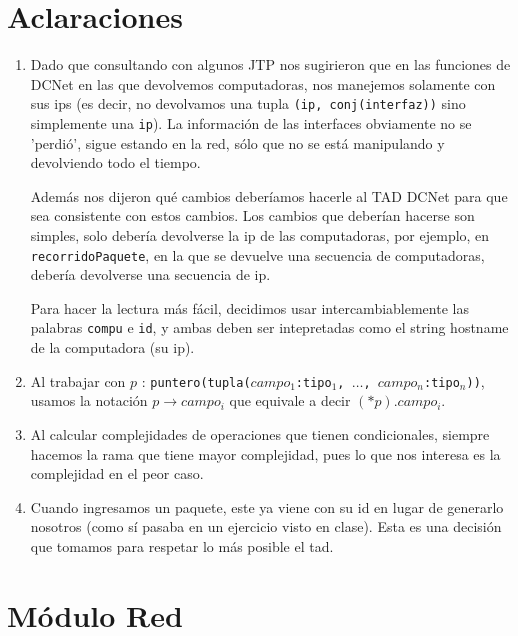 \documentclass[a4paper,10pt, nofootinbib]{article}
\begin{document}
\maketitle
\thispagestyle{empty}

\section{Aclaraciones}
\begin{enumerate}
  \item Dado que consultando con algunos JTP nos sugirieron que en las funciones de DCNet en las que devolvemos computadoras, nos manejemos solamente con sus ips (es decir, no devolvamos una tupla \texttt{(ip, conj(interfaz))} sino simplemente una \texttt{ip}). La información de las interfaces obviamente no se 'perdió', sigue estando en la red, sólo que no se está manipulando y devolviendo todo el tiempo.
   
    Además nos dijeron qué cambios deberíamos hacerle al TAD DCNet para que sea consistente con estos cambios. Los cambios que deberían hacerse son simples, solo debería devolverse la ip de las computadoras, por ejemplo, en \texttt{recorridoPaquete}, en la que se devuelve una secuencia de computadoras, debería devolverse una secuencia de ip.
    
    Para hacer la lectura más fácil, decidimos usar intercambiablemente las palabras \texttt{compu} e \texttt{id}, y ambas deben ser intepretadas como el string hostname de la computadora (su ip).
    
    \item Al trabajar con $p$ : \texttt{puntero(tupla($campo_1$:tipo$_1$, $\dots$, $campo_n$:tipo$_n$))}, usamos la notación $p\to campo_i$ que equivale a decir $(*p).campo_i$. 
    \item Al calcular complejidades de operaciones que tienen condicionales, siempre hacemos la rama que tiene mayor complejidad, pues lo que nos interesa es la complejidad en el peor caso. 
	\item Cuando ingresamos un paquete, este ya viene con su id en lugar de generarlo nosotros (como sí pasaba en un ejercicio visto en clase). Esta es una decisión que tomamos para respetar lo más posible el tad. 

\end{enumerate}

\clearpage


\section{Módulo Red}

\clearpage
\end{document}
